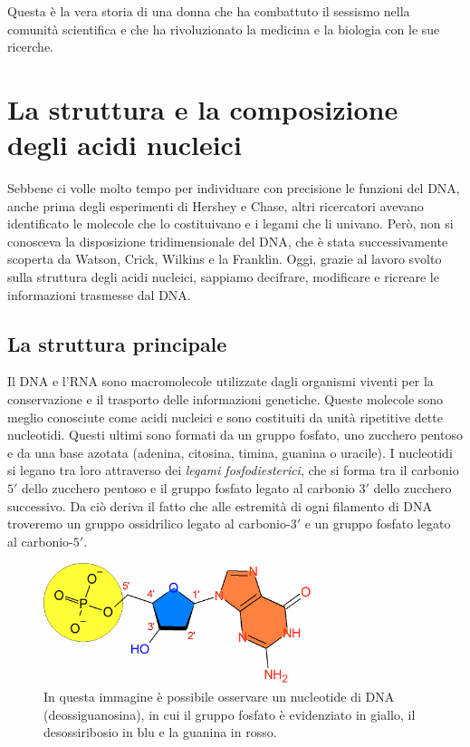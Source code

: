 \documentclass[11pt]{report}
\begin{document}
	Questa è la vera storia di una donna che ha combattuto il sessismo nella comunità scientifica e che ha rivoluzionato la medicina e la biologia con le sue ricerche.\cite{TedEd2016franklin}
	
	\chapter{La struttura e la composizione degli acidi nucleici}
	
	Sebbene ci volle molto tempo per individuare con precisione le funzioni del DNA, anche prima degli esperimenti di Hershey e Chase, altri ricercatori avevano identificato le molecole che lo costituivano e i legami che li univano. Però, non si conosceva la disposizione tridimensionale del DNA, che è stata successivamente scoperta da Watson, Crick, Wilkins e la Franklin. Oggi, grazie al lavoro svolto sulla struttura degli acidi nucleici, sappiamo decifrare, modificare e ricreare le informazioni trasmesse dal DNA.
	
	\section{La struttura principale}
	
	Il DNA e l'RNA sono macromolecole utilizzate dagli organismi viventi per la conservazione e il trasporto delle informazioni genetiche. Queste molecole sono meglio conosciute come acidi nucleici e sono costituiti da unità ripetitive dette nucleotidi. Questi ultimi sono formati da un gruppo fosfato, uno zucchero pentoso e da una base azotata (adenina, citosina, timina, guanina o uracile). I nucleotidi si legano tra loro attraverso dei \textit{legami fosfodiesterici}, che si forma tra il carbonio $5'$ dello zucchero pentoso e il gruppo fosfato legato al carbonio $3'$ dello zucchero successivo. Da ciò deriva il fatto che alle estremità di ogni filamento di DNA troveremo un gruppo ossidrilico legato al carbonio-$3'$ e un gruppo fosfato legato al carbonio-$5'$. 

	\begin{figure}[h]
	\centering
	\includegraphics[width=0.7\textwidth]{nucleotideguanina1.png}	
	\caption{{\small In questa immagine è possibile osservare un nucleotide di DNA (deossiguanosina), in cui il gruppo fosfato è evidenziato in giallo, il desossiribosio in blu e la guanina in rosso.}}
	\end{figure}
\end{document}
